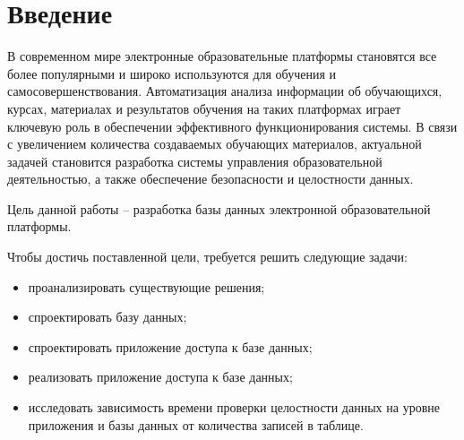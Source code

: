 \chapter*{Введение}

В современном мире электронные образовательные платформы становятся все более популярными и широко используются для обучения и самосовершенствования. Автоматизация анализа информации об обучающихся, курсах, материалах и результатов обучения на таких платформах играет ключевую роль в обеспечении эффективного функционирования системы. В связи с увеличением количества создаваемых обучающих материалов, актуальной задачей становится разработка системы управления образовательной деятельностью, а также обеспечение безопасности и целостности данных.

Цель данной работы -- разработка базы данных электронной образовательной платформы.

Чтобы достичь поставленной цели, требуется решить следующие задачи: 
\begin{itemize}
    \item проанализировать существующие решения;
    \item спроектировать базу данных;
    \item спроектировать приложение доступа к базе данных;
    \item реализовать приложение доступа к базе данных;
    \item исследовать зависимость времени проверки целостности данных на уровне приложения и базы данных от количества записей в таблице.
\end{itemize}
